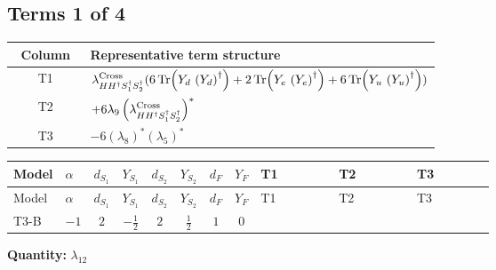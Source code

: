 \documentclass[8pt]{article}
\begin{document}
\begin{landscape}
\subsection*{Terms 1 of 4}
\begin{center}
\begin{tabular}{@{}c >{\raggedright\arraybackslash}p{0.82\linewidth}@{}}
\toprule
Column & Representative term structure \\
\midrule
T1 & \(\displaystyle {\lambda_{H H^\dagger S_1^\dagger S_2^\dagger}^{\rm Cross}} (6 \operatorname{Tr}\!\left({Y_d}\,\left({Y_d}\right)^{\dagger}\right)+2 \operatorname{Tr}\!\left({Y_e}\,\left({Y_e}\right)^{\dagger}\right)+6 \operatorname{Tr}\!\left({Y_u}\,\left({Y_u}\right)^{\dagger}\right))\) \\
\midrule
T2 & \(\displaystyle +6 {\lambda_{9}} \left({\lambda_{H H^\dagger S_1^\dagger S_2^\dagger}^{\rm Cross}}\right)^{*}\) \\
\midrule
T3 & \(\displaystyle -6 \left({\lambda_{8}}\right)^{*} \left({\lambda_5}\right)^{*}\) \\
\midrule
\bottomrule
\end{tabular}
\end{center}
\smallskip
\tiny
\begin{longtable}{@{}llcccccc >{\raggedright\arraybackslash}p{0.21\linewidth} >{\raggedright\arraybackslash}p{0.21\linewidth} >{\raggedright\arraybackslash}p{0.21\linewidth}@{}}
\toprule
Model & $\alpha$ & $d_{S_1}$ & $Y_{S_1}$ & $d_{S_2}$ & $Y_{S_2}$ & $d_F$ & $Y_F$ & T1 & T2 & T3 \\
\midrule
\endfirsthead
\toprule
Model & $\alpha$ & $d_{S_1}$ & $Y_{S_1}$ & $d_{S_2}$ & $Y_{S_2}$ & $d_F$ & $Y_F$ & T1 & T2 & T3 \\
\midrule
\endhead
T3-B & $-1$ & $2$ & $-\frac{1}{2}$ & $2$ & $\frac{1}{2}$ & $1$ & $0$ & \scriptsize\adjustbox{max width=\linewidth}{$\begin{gathered} {\lambda_{H H^\dagger S_1^\dagger S_2^\dagger}^{\rm Cross}} (6 \operatorname{Tr}\!\left({Y_d}\,\left({Y_d}\right)^{\dagger}\right)+2 \operatorname{Tr}\!\left({Y_e}\,\left({Y_e}\right)^{\dagger}\right)+6 \operatorname{Tr}\!\left({Y_u}\,\left({Y_u}\right)^{\dagger}\right))\end{gathered}$} & \scriptsize\adjustbox{max width=\linewidth}{$\begin{gathered} +6 {\lambda_{9}} \left({\lambda_{H H^\dagger S_1^\dagger S_2^\dagger}^{\rm Cross}}\right)^{*}\end{gathered}$} & \scriptsize\adjustbox{max width=\linewidth}{$\begin{gathered} -6 \left({\lambda_{8}}\right)^{*} \left({\lambda_5}\right)^{*}\end{gathered}$} \\
\midrule
\bottomrule
\end{longtable}
\clearpage
\noindent\textbf{Quantity: }$\lambda_{12}$\par\smallskip

\end{landscape}
\end{document}
